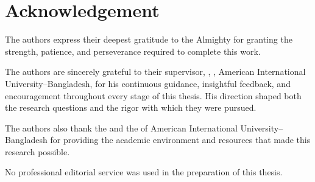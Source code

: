 \chapter*{Acknowledgement}

The authors express their deepest gratitude to the Almighty for granting the
strength, patience, and perseverance required to complete this work.

The authors are sincerely grateful to their supervisor, \textbf{\supervisorname},
\department, American International University--Bangladesh, for his continuous
guidance, insightful feedback, and encouragement throughout every stage of this
thesis. His direction shaped both the research questions and the rigor with
which they were pursued.

The authors also thank the \department{} and the \faculty{} of American
International University--Bangladesh for providing the academic environment and
resources that made this research possible.

No professional editorial service was used in the preparation of this thesis.

\clearpage
